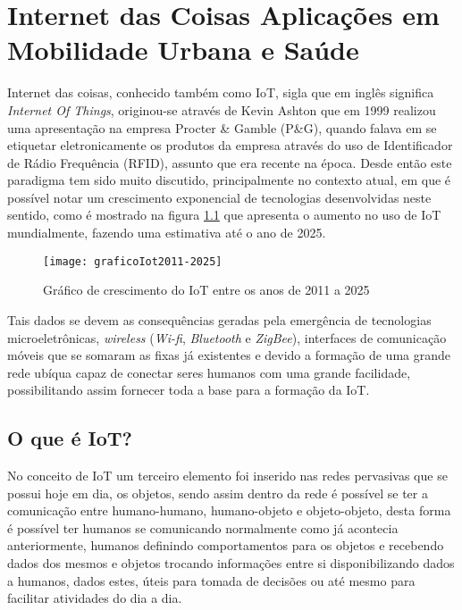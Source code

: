 \chapter{Internet das Coisas Aplicações em Mobilidade Urbana e Saúde}
\label{chap:cap1}
Internet das coisas, conhecido também como IoT, sigla que em inglês significa \textit{Internet Of Things}, originou-se através de Kevin Ashton que em 1999 realizou uma apresentação na empresa  Procter \& Gamble (P\&G), quando falava em se etiquetar eletronicamente os produtos da empresa através do uso de Identificador de Rádio Frequência (RFID), assunto que era recente na época. Desde então este paradigma tem sido muito discutido, principalmente no contexto atual, em que é possível notar um crescimento exponencial de tecnologias desenvolvidas neste sentido, como é mostrado na figura \ref{fig:graficoIot2011-2025} que apresenta o aumento no uso de IoT mundialmente, fazendo uma estimativa até o ano de 2025.\cite{historiaiot} 

\begin{figure}[htb]
\caption{\label{fig:graficoIot2011-2025}Gráfico de crescimento do IoT entre os anos de 2011 a 2025}
\begin{center}
\texttt{[image: graficoIot2011-2025]}
\end{center}
\end{figure}

Tais dados se devem as consequências geradas pela emergência de tecnologias microeletrônicas, \textit{wireless} (\textit{Wi-fi}, \textit{Bluetooth} e \textit{ZigBee}), interfaces de comunicação móveis que se somaram as fixas já existentes e devido a formação de uma grande rede ubíqua capaz de conectar seres humanos com uma grande facilidade, possibilitando assim fornecer toda a base para a formação da IoT. \cite{santaella2013} 

\section{O que é IoT?}
\label{sec:oqueeiot}
No conceito de IoT um terceiro elemento foi inserido nas redes pervasivas que se possui hoje em dia, os objetos, sendo assim dentro da rede é possível se ter a comunicação entre humano-humano, humano-objeto e objeto-objeto, desta forma é possível ter humanos se comunicando normalmente como já acontecia anteriormente, humanos definindo comportamentos para os objetos e recebendo dados dos mesmos e objetos trocando informações entre si disponibilizando dados a humanos, dados estes, úteis para tomada de decisões ou até mesmo para facilitar atividades do dia a dia.\cite{santaella2013}


